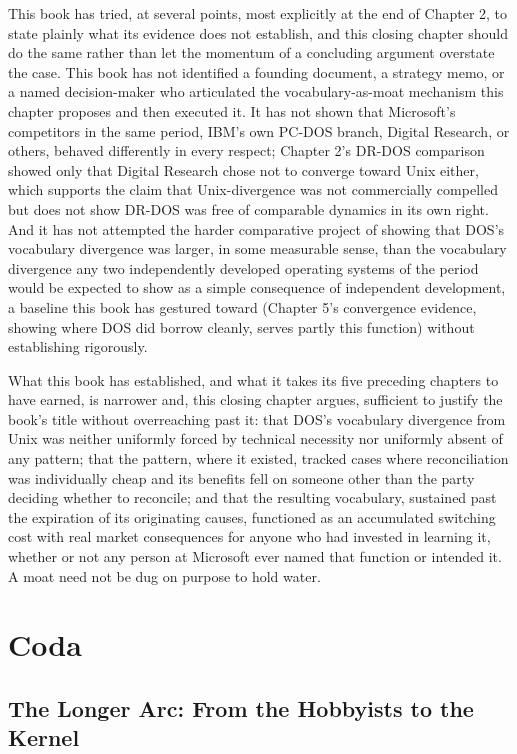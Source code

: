 \documentclass[11pt]{book}
\begin{document}
This book has tried, at several points, most explicitly at the end of Chapter 2, to state plainly what its evidence does not establish, and this closing chapter should do the same rather than let the momentum of a concluding argument overstate the case. This book has not identified a founding document, a strategy memo, or a named decision-maker who articulated the vocabulary-as-moat mechanism this chapter proposes and then executed it. It has not shown that Microsoft's competitors in the same period, IBM's own PC-DOS branch, Digital Research, or others, behaved differently in every respect; Chapter 2's DR-DOS comparison showed only that Digital Research chose not to converge toward Unix either, which supports the claim that Unix-divergence was not commercially compelled but does not show DR-DOS was free of comparable dynamics in its own right. And it has not attempted the harder comparative project of showing that DOS's vocabulary divergence was larger, in some measurable sense, than the vocabulary divergence any two independently developed operating systems of the period would be expected to show as a simple consequence of independent development, a baseline this book has gestured toward (Chapter 5's convergence evidence, showing where DOS did borrow cleanly, serves partly this function) without establishing rigorously.

What this book has established, and what it takes its five preceding chapters to have earned, is narrower and, this closing chapter argues, sufficient to justify the book's title without overreaching past it: that DOS's vocabulary divergence from Unix was neither uniformly forced by technical necessity nor uniformly absent of any pattern; that the pattern, where it existed, tracked cases where reconciliation was individually cheap and its benefits fell on someone other than the party deciding whether to reconcile; and that the resulting vocabulary, sustained past the expiration of its originating causes, functioned as an accumulated switching cost with real market consequences for anyone who had invested in learning it, whether or not any person at Microsoft ever named that function or intended it. A moat need not be dug on purpose to hold water.

\part{Coda}

\chapter{The Longer Arc: From the Hobbyists to the Kernel}
\end{document}
